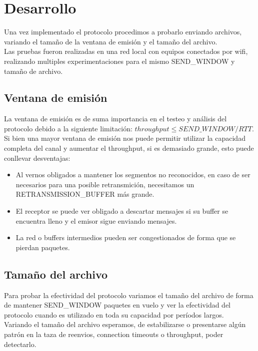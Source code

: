 \section{Desarrollo}

Una vez implementado el protocolo procedimos a probarlo enviando archivos, variando el tamaño de la ventana de emisión y el tamaño del archivo.	 \\
\indent	Las pruebas fueron realizadas en una red local con equipos conectados por wifi, realizando multiples experimentaciones para el mismo SEND\_WINDOW y tamaño de archivo.	\\

\subsection{Ventana de emisión}

La ventana de emisión es de suma importancia en el testeo y análisis del protocolo debido a la siguiente limitación: $throughput \leq SEND\_WINDOW / RTT$.	\\
Si bien una mayor ventana de emisión nos puede permitir utilizar la capacidad completa del canal y aumentar el throughput, si es demasiado grande, esto puede conllevar desventajas: 
\begin{itemize}
\item	Al vernos obligados a mantener los segmentos no reconocidos, en caso de ser necesarios para una posible retransmición, necesitamos un RETRANSMISSION\_BUFFER más grande.
\item	El receptor se puede ver obligado a descartar mensajes si su buffer se encuentra lleno y el emisor sigue enviando mensajes.
\item	La red o buffers intermedios pueden ser congestionados de forma que se pierdan paquetes.
\end{itemize}

\subsection{Tamaño del archivo}

Para probar la efectividad del protocolo variamos el tamaño del archivo de forma de mantener SEND\_WINDOW 
paquetes en vuelo y ver la efectividad del protocolo cuando es utilizado en toda su capacidad por períodos largos.	\\
\indent	Variando el tamaño del archivo esperamos, de estabilizarse o presentarse algún patrón en la taza de reenvios, connection timeouts o throughput, poder detectarlo.

